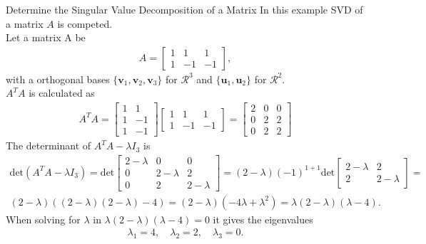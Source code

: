 \begin{example}{Determine the Singular Value Decomposition of a Matrix}
In this example SVD of a matrix $A$ is competed.\\
Let a matrix A be
\begin{align*}
A=
\begin{bmatrix}
   1 & 1 & 1\\
   1 & -1 & -1
\end{bmatrix},
\end{align*}
with a orthogonal bases $\{\mathbf{v}_1,\mathbf{v}_2,\mathbf{v}_3\}$ for $\mathcal{R}^3$ and $\{\mathbf{u}_1,\mathbf{u}_2\}$ for $\mathcal{R}^2$.\\
$A^TA$ is calculated as
\begin{align*}
    A^TA=
    \begin{bmatrix}
       1 & 1\\
       1 & -1\\
       1 & -1
    \end{bmatrix}
    \begin{bmatrix}
       1 & 1 & 1\\
       1 & -1 & -1
    \end{bmatrix}
    =
    \begin{bmatrix}
       2 & 0 & 0\\
       0 & 2 & 2\\
       0 & 2 & 2
    \end{bmatrix}
\end{align*}
The determinant of $A^TA-\lambda I_3$ is
\begin{align*}
    \text{det}(A^TA-\lambda I_3)=\text{det}
    \begin{bmatrix}
       2-\lambda & 0 & 0\\
       0 & 2-\lambda & 2\\
       0 & 2 & 2-\lambda
    \end{bmatrix}=
    (2-\lambda)(-1)^{1+1} \text{det}
    \begin{bmatrix}
        2-\lambda & 2 \\
        2 &2-\lambda
    \end{bmatrix}=\\
    (2-\lambda)((2-\lambda)(2-\lambda)-4) =
    (2-\lambda)(-4\lambda+\lambda^2) = \lambda(2-\lambda)(\lambda-4).
\end{align*}
    When solving for $\lambda$ in $\lambda(2-\lambda)(\lambda-4)=0$
    it gives the eigenvalues
    \begin{align*}
      \lambda_1=4, \quad \lambda_2=2, \quad \lambda_3=0.   

\end{align*}
\end{example}
